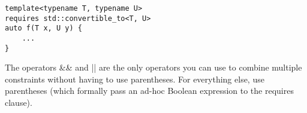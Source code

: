 \begin{lstlisting}[style=styleCXX]
template<typename T, typename U>
requires std::convertible_to<T, U>
auto f(T x, U y) {
	...
}
\end{lstlisting}

The operators \&\& and || are the only operators you can use to combine multiple constraints without having to use parentheses. For everything else, use parentheses (which formally pass an ad-hoc Boolean expression to the requires clause).






























